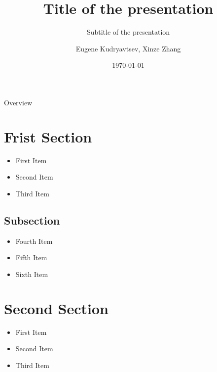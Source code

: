 \documentclass{beamer}
\title{Title of the presentation}
\subtitle{Subtitle of the presentation}
\author[Eugene, Xinze]{Eugene Kudryavtsev, Xinze Zhang}
\date{\today}
\institute[BFH]{Berner Fachhochschule, Huazhong University of Science \& Technology}
\begin{document}
\begin{frame}[plain]
  \titlepage
\end{frame}

\begin{frame}[noframenumbering]{Overview}
  \tableofcontents
\end{frame}



\section{Frist Section}

\begin{frame}{\insertsection}
  \begin{itemize}
    \item First Item
    \item Second Item
    \item Third Item
  \end{itemize}
\end{frame}

\subsection{Subsection}

\begin{frame}{\insertsection}{\insertsubsection}
  \begin{itemize}
    \item Fourth Item
    \item Fifth Item
    \item Sixth Item
  \end{itemize}
\end{frame}


\section{Second Section}

\begin{frame}{\insertsection}
  \begin{itemize}
    \item First Item
    \item Second Item
    \item Third Item
  \end{itemize}
\end{frame}
\end{document}
